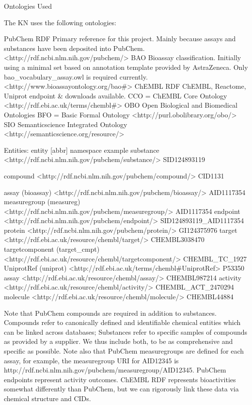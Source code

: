Ontologies Used

The KN uses the following ontologies:

PubChem RDF
Primary reference for this project.  Mainly because assays and substances have been deposited into PubChem. 
<http://rdf.ncbi.nlm.nih.gov/pubchem/>
BAO
Bioassay classification.  Initially using a minimal set based on annotation template provided by AstraZeneca.  Only bao\_vocabulary\_assay.owl is required currently.
<http://www.bioassayontology.org/bao\#>
ChEMBL RDF
ChEMBL, Reactome, Uniprot endpoint \& downloads available.
CCO = ChEMBL Core Ontology
<http://rdf.ebi.ac.uk/terms/chembl\#>
OBO
Open Biological and Biomedical Ontologies
BFO = Basic Formal Ontology
<http://purl.obolibrary.org/obo/>
SIO
Semanticscience Integrated Ontology
<http://semanticscience.org/resource/>


Entities:
entity [abbr] namespace
example
substance
<http://rdf.ncbi.nlm.nih.gov/pubchem/substance/>
SID124893119


compound
<http://rdf.ncbi.nlm.nih.gov/pubchem/compound/>
CID1131


assay (bioassay)
<http://rdf.ncbi.nlm.nih.gov/pubchem/bioassay/>
AID1117354
measuregroup (measureg)
<http://rdf.ncbi.nlm.nih.gov/pubchem/measuregroup/>
AID1117354
endpoint
<http://rdf.ncbi.nlm.nih.gov/pubchem/endpoint/>
SID124893119\_AID1117354
protein
<http://rdf.ncbi.nlm.nih.gov/pubchem/protein/>
GI124375976
target
<http://rdf.ebi.ac.uk/resource/chembl/target/>
CHEMBL3038470
targetcomponent (target\_cmpt)
<http://rdf.ebi.ac.uk/resource/chembl/targetcomponent/>
CHEMBL\_TC\_1927
UniprotRef (uniprot)
<http://rdf.ebi.ac.uk/terms/chembl\#UniprotRef>
P53350
assay
<http://rdf.ebi.ac.uk/resource/chembl/assay/>
CHEMBL987214
activity
<http://rdf.ebi.ac.uk/resource/chembl/activity/>
CHEMBL\_ACT\_2470294
molecule
<http://rdf.ebi.ac.uk/resource/chembl/molecule/>
CHEMBL44884

Note that PubChem compounds are required in addition to substances.  Compounds refer to canonically defined and identifiable chemical entities which can be linked across databases; Substances refer to specific samples of compounds as provided by a supplier.  We thus include both, to be as comprehensive and specific as possible.   Note also that PubChem measuregroups are defined for each assay, for example, the measuregroup URI for AID12345 is http://rdf.ncbi.nlm.nih.gov/pubchem/measuregroup/AID12345.  PubChem endpoints represent activity outcomes.  ChEMBL RDF represents bioactivities somewhat differently than PubChem, but we can rigorously link these data via chemical structure and CIDs.


